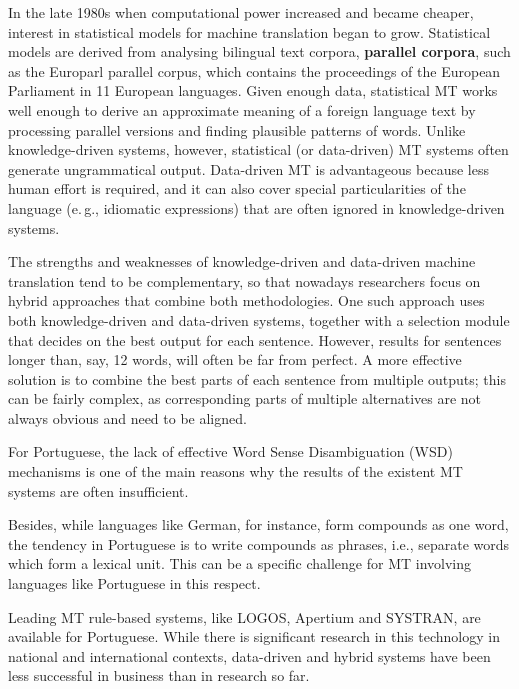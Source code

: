 \documentclass[]{../metanetpaper}
\begin{document}
\begin{multicols}{2}
In the late 1980s when computational power increased and became cheaper, interest in statistical models for machine translation began to grow. Statistical models are derived from analysing bilingual text corpora, \textbf{parallel corpora}, such as the Europarl parallel corpus, which contains the proceedings of the European Parliament in 11 European languages. Given enough data, statistical MT works well enough to derive an approximate meaning of a foreign language text by processing parallel versions and finding plausible patterns of words. Unlike knowledge-driven systems, however, statistical (or data-driven) MT systems often generate ungrammatical output. Data-driven MT is advantageous because less human effort is required, and it can also cover special particularities of the language (e.\,g., idiomatic expressions) that are often ignored in knowledge-driven systems. 

The strengths and weaknesses of knowledge-driven and data-driven machine translation tend to be complementary, so that nowadays researchers focus on hybrid approaches that combine both methodologies. One such approach uses both knowledge-driven and data-driven systems, together with a selection module that decides on the best output for each sentence. However, results for sentences longer than, say, 12 words, will often be far from perfect. A more effective solution is to combine the best parts of each sentence from multiple outputs; this can be fairly complex, as corresponding parts of multiple alternatives are not always obvious and need to be aligned. 


For Portuguese, the lack of effective Word Sense Disambiguation (WSD) mechanisms is one of the main reasons why the results of the existent MT systems are often insufficient. 

Besides, while languages like German, for instance, form compounds as one word, the tendency in Portuguese is to write compounds as phrases, i.e., separate words which form a lexical unit. This can be a specific challenge for MT involving languages like Portuguese in this respect.

Leading MT rule-based systems, like LOGOS, Apertium and SYSTRAN, are available for Portuguese. While there is significant research in this technology in national and international contexts, data-driven and hybrid systems have been less successful in business than in research so far. 


\end{multicols}
\end{document}
